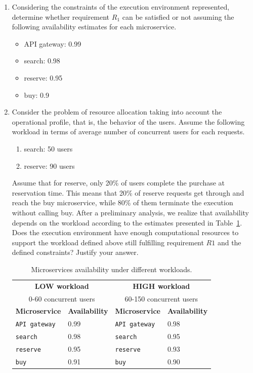 \questionproblem
\begin{enumerate}
    \item Considering the constraints of the execution environment represented, determine whether requirement $R_{1}$ can be satisfied or not assuming the following availability estimates for each microservice.
    \begin{itemize}
        \item API gateway: 0.99
        \item search: 0.98
        \item reserve: 0.95
        \item buy: 0.9
    \end{itemize}

    \item Consider the problem of resource allocation taking into account the operational profile, that is, the behavior of the users. Assume the following workload in terms of average number of concurrent users for each requests.
    \begin{enumerate}
        \item search: 50 users
        \item reserve: 90 users
    \end{enumerate}
    Assume that for reserve, only 20\% of users complete the purchase at reservation time. This means that 20\% of reserve requests get through and reach the buy microservice, while 80\% of them terminate the execution without calling buy. After a preliminary analysis, we realize that availability depends on the workload according to the estimates presented in Table~\ref{table: microservices availability under different workloads}. Does the execution environment have enough computational resources to support the workload defined above still fulfilling requirement $R1$ and the defined constraints? Justify your answer.
    \begin{table}[!htp]
        \centering
        \begin{tabular}{@{} l l | l l @{}}
            \toprule
            \multicolumn{2}{c}{\textbf{LOW workload}} & \multicolumn{2}{c}{\textbf{HIGH workload}} \\
            \multicolumn{2}{c}{0-60 concurrent users} & \multicolumn{2}{c}{60-150 concurrent users} \\
            \cmidrule{1-4}
            \textbf{Microservice} & \textbf{Availability} & \textbf{Microservice} & \textbf{Availability} \\
            \midrule
            \texttt{API gateway} & 0.99 & \texttt{API gateway} & 0.98 \\
            \texttt{search} & 0.98 & \texttt{search} & 0.95 \\
            \texttt{reserve} & 0.95 & \texttt{reserve} & 0.93 \\
            \texttt{buy} & 0.91 & \texttt{buy} & 0.90 \\
            \bottomrule
        \end{tabular}
        \caption{Microservices availability under different workloads.}
        \label{table: microservices availability under different workloads}
    \end{table}
\end{enumerate}

